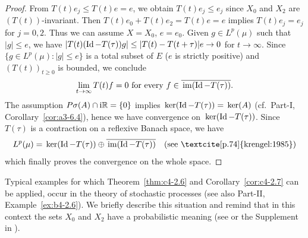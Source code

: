 \begin{proof}
From $T(t)e_{j} \leq T(t)e = e$, we obtain $T(t)e_{j} \leq e_{j}$ since $X_{0}$ and $X_{2}$ are $(T(t))$-invariant.
Then $T(t)e_{0} + T(t)e_{2} = T(t)e = e$ implies $T(t)e_{j} = e_{j}$ for $j=0,2$.
Thus we can assume $X = X_{0}$, $e = e_{0}$.
Given $g \in L^{p}(\mu)$ such that $|g| \leq e$, we have
$|T(t)(\Id - T(\tau))g| \leq |T(t) - T(t+\tau)|e \to 0$ for $t \to \infty$.
Since $\{g \in L^{p}(\mu) \colon |g| \leq e\}$ is a total subset of\/ $E$ ($e$ is strictly positive) and $(T(t))_{t \geq 0}$ is bounded, we conclude
\begin{equation}\label{eq:c4-2.6}
\lim_{t \to \infty} T(t)f = 0 \text{ for every } f \in \overline{\mathop{}\mathrm{im}(\operatorname{Id} - T(\tau))}.
\end{equation}
The assumption $P{\sigma}(A) \cap \mathrm{i}\mathbb{R} = \{0\}$ implies $\mathop{}\mathrm{ker}(\operatorname{Id} - T(\tau)) = \mathop{}\mathrm{ker}(A)$ (cf.\ 
Part-I, Corollary~\ref{cor:a3-6.4}), hence we have convergence on $\mathop{}\mathrm{ker}(\operatorname{Id} -T(\tau))$.
Since $T(\tau)$ is a contraction on a reflexive Banach space, we have
\[
L^{p}(\mu) = \Kern{\Id - T(\tau)} \oplus \overline{\Image{\Id - T(\tau)}} \quad \text{(see \textcite [p.74]{krengel:1985})}
\]  
which finally proves the convergence on the whole space.
\end{proof}
Typical examples for which Theorem~\ref{thm:c4-2.6} and Corollary~\ref{cor:c4-2.7}  can be applied, occur in the theory of stochastic processes (see also Part-II, Example~\ref{ex:b4-2.6}).
We briefly describe this situation and remind that in this context the sets $X_{0}$ and $X_{2}$ have a probabilistic meaning (see \textcite{greinernagel:1982} or the Supplement in \textcite{krengel:1985}).
